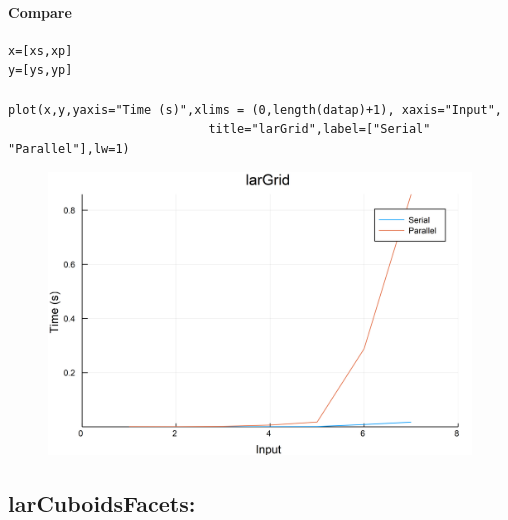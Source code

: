\documentclass{article}
\begin{document}
\paragraph{Compare}
\begin{flushleft}\small
\begin{list}{}{} \item
    \begin{Verbatim}[tabsize=4]
x=[xs,xp]
y=[ys,yp]

plot(x,y,yaxis="Time (s)",xlims = (0,length(datap)+1), xaxis="Input",
                            title="larGrid",label=["Serial" "Parallel"],lw=1)
    \end{Verbatim}
\end{list}
\end{flushleft}   
\vspace{3ex}
\begin{figure}[h!]
\centering
\includegraphics[scale=0.06]{larGridCom.png}
\end{figure}

\vspace{4ex}

\subsection{larCuboidsFacets:}
\end{document}
